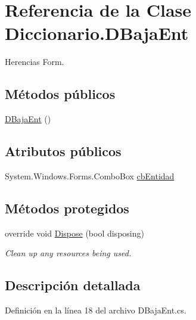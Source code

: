 \hypertarget{class_diccionario_1_1_d_baja_ent}{\section{Referencia de la Clase Diccionario.\-D\-Baja\-Ent}
\label{class_diccionario_1_1_d_baja_ent}
}


Herencias Form.

\subsection*{Métodos públicos}
\begin{DoxyCompactItemize}
\item 
\hyperlink{class_diccionario_1_1_d_baja_ent_aa6f6bb62c9634a4f16aee8002700cb83}{D\-Baja\-Ent} ()
\end{DoxyCompactItemize}
\subsection*{Atributos públicos}
\begin{DoxyCompactItemize}
\item 
System.\-Windows.\-Forms.\-Combo\-Box \hyperlink{class_diccionario_1_1_d_baja_ent_a3b31f633d966da43daa526d71adfb578}{cb\-Entidad}
\end{DoxyCompactItemize}
\subsection*{Métodos protegidos}
\begin{DoxyCompactItemize}
\item 
override void \hyperlink{class_diccionario_1_1_d_baja_ent_a949b0b389716b1b98b66eaf87572f5e0}{Dispose} (bool disposing)
\begin{DoxyCompactList}\small\item\em Clean up any resources being used. \end{DoxyCompactList}\end{DoxyCompactItemize}


\subsection{Descripción detallada}


Definición en la línea 18 del archivo D\-Baja\-Ent.\-cs.



